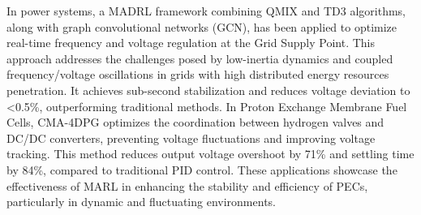 In power systems, a MADRL framework combining QMIX and TD3 algorithms, along with graph convolutional networks (GCN), has been applied to optimize real-time frequency and voltage regulation at the Grid Supply Point. This approach addresses the challenges posed by low-inertia dynamics and coupled frequency/voltage oscillations in grids with high distributed energy resources penetration. It achieves sub-second stabilization and reduces voltage deviation to <0.5\%, outperforming traditional methods. In Proton Exchange Membrane Fuel Cells, CMA-4DPG optimizes the coordination between hydrogen valves and DC/DC converters, preventing voltage fluctuations and improving voltage tracking. This method reduces output voltage overshoot by 71\% and settling time by 84\%, compared to traditional PID control. These applications showcase the effectiveness of MARL in enhancing the stability and efficiency of PECs, particularly in dynamic and fluctuating environments.



